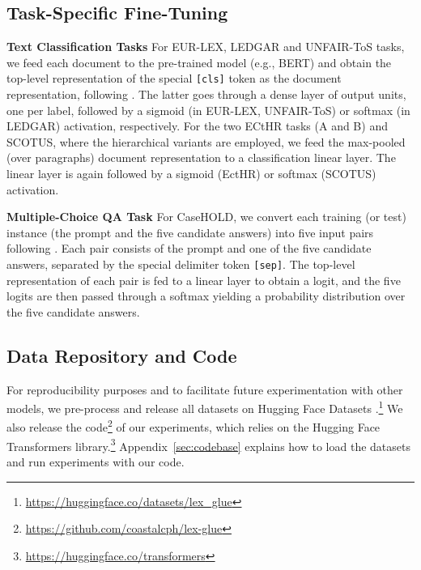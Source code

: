 \documentclass[11pt]{article}
\newcommand{\cls}{\texttt{\small [cls]}\xspace}
\newcommand{\sep}{\texttt{\small [sep]}\xspace}
\begin{document}
\subsection{Task-Specific Fine-Tuning}

\noindent\textbf{Text Classification Tasks} For EUR-LEX, LEDGAR and UNFAIR-ToS tasks, we feed each document to the pre-trained model (e.g., BERT) and obtain the top-level representation  of the special \cls token as the document representation, following \citet{devlin-etal-2019-bert}. The latter goes through a dense layer of  output units, one per label, followed by a sigmoid (in EUR-LEX, UNFAIR-ToS) or softmax (in LEDGAR) activation, respectively. For the two ECtHR tasks (A and B) and SCOTUS, where the hierarchical variants are employed, we feed the max-pooled (over paragraphs) document representation to a classification linear layer. The linear layer is again followed by a sigmoid (EctHR) or softmax (SCOTUS) activation.\vspace{2mm}


\noindent\textbf{Multiple-Choice QA Task} For CaseHOLD, we convert each training (or test) instance (the prompt and the five candidate answers) into five input pairs following \citet{zhengguha2021}. Each pair consists of the prompt and one of the five candidate answers, separated by the special delimiter token \sep. The top-level representation  of each pair is fed to a linear layer to obtain a logit, and the five logits are then passed through a softmax yielding a probability distribution over the five candidate answers.

\subsection{Data Repository and Code}
\label{sec:resources}

For reproducibility purposes and to facilitate future experimentation with other models, we pre-process and release all datasets on Hugging Face Datasets \cite{lhoest2021datasets}.\footnote{\url{https://huggingface.co/datasets/lex_glue}}  We also release the code\footnote{\url{https://github.com/coastalcph/lex-glue}} of our experiments, which relies on the Hugging Face Transformers \cite{wolf-etal-2020-transformers} library.\footnote{\url{https://huggingface.co/transformers}} Appendix~\ref{sec:codebase} explains how to load the datasets and run experiments with our code. 
\end{document}
